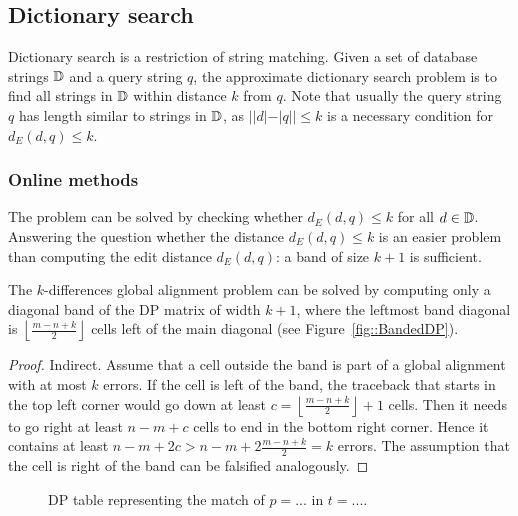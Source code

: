 
\subsection{Dictionary search}

Dictionary search is a restriction of string matching.
Given a set of database strings $\mathbb {D}$ and a query string $q$, the approximate dictionary search problem is to find all strings in $\mathbb {D}$ within distance $k$ from $q$.
Note that usually the query string $q$ has length similar to strings in $\mathbb {D}$, as $| |d| - |q| | \leq k$ is a necessary condition for $d_E(d,q) \leq k$.

\subsubsection{Online methods}

The problem can be solved by checking whether $d_E(d,q) \leq k$ for all $d \in \mathbb {D}$.
Answering the question whether the distance $d_E(d,q) \leq k$ is an easier problem than computing the edit distance $d_E(d,q)$: a band of size $k+1$ is sufficient.

\begin{lemma}
\label{lemma:kband}
The $k$-differences global alignment problem can be solved by computing only a diagonal band of the DP matrix of width $k+1$, where the leftmost band diagonal is $\left\lfloor\frac{m-n+k}{2}\right\rfloor$ cells left of the main diagonal (see Figure~\ref{fig::BandedDP}).
\end{lemma}
\begin{proof}
Indirect. Assume that a cell outside the band is part of a global alignment with at most $k$ errors.
If the cell is left of the band, the traceback that starts in the top left corner would go down at least $c=\left\lfloor\frac{m-n+k}{2}\right\rfloor+1$ cells. Then it needs to go right at least $n-m+c$ cells to end in the bottom right corner.
Hence it contains at least $n-m+2c>n-m+2\frac{m-n+k}{2}=k$ errors.
The assumption that the cell is right of the band can be falsified analogously.
\end{proof}

\begin{figure}[h]
\begin{center}
\caption{DP table representing the match of $p=...$ in $t=...$.}
\label{fig:dict-dp}

\end{center}
\end{figure}

